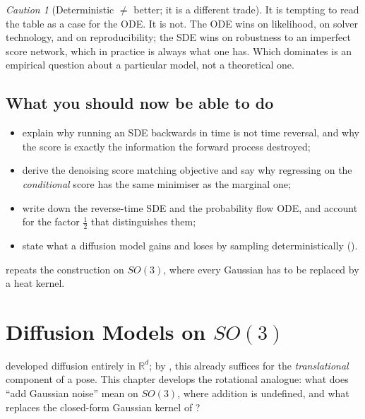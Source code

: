 \documentclass[11pt,a4paper]{report}
\theoremstyle{definition}
\theoremstyle{remark}
\newtheorem{caution}[caution]{Caution}
\newcommand{\RR}{\mathbb R}
\begin{document}
\begin{caution}[Deterministic $\ne$ better; it is a different trade]
\label{caution:ode-vs-sde-tradeoff}
It is tempting to read the table as a case for the ODE. It is not. The ODE
wins on likelihood, on solver technology, and on reproducibility; the SDE
wins on robustness to an imperfect score network, which in practice is
always what one has. Which dominates is an empirical question about a
particular model, not a theoretical one.
\end{caution}


\section{What you should now be able to do}

\begin{itemize}[nosep]
\item explain why running an SDE backwards in time is not time reversal, and why the score is exactly the information the forward process destroyed;
\item derive the denoising score matching objective and say why regressing on the \emph{conditional} score has the same minimiser as the marginal one;
\item write down the reverse-time SDE and the probability flow ODE, and account for the factor $\tfrac12$ that distinguishes them;
\item state what a diffusion model gains and loses by sampling deterministically ().
\end{itemize}

 repeats the construction on $SO(3)$, where every Gaussian has to be replaced by a heat kernel.

\clearpage

\chapter{Diffusion Models on $SO(3)$}
\label{chap:diffusion-so3}

 developed diffusion entirely in $\RR^d$; by
, this already suffices for the \emph{translational}
component of a pose. This chapter develops the rotational analogue: what
does ``add Gaussian noise'' mean on $SO(3)$, where addition is undefined,
and what replaces the closed-form Gaussian kernel of
?
\end{document}
